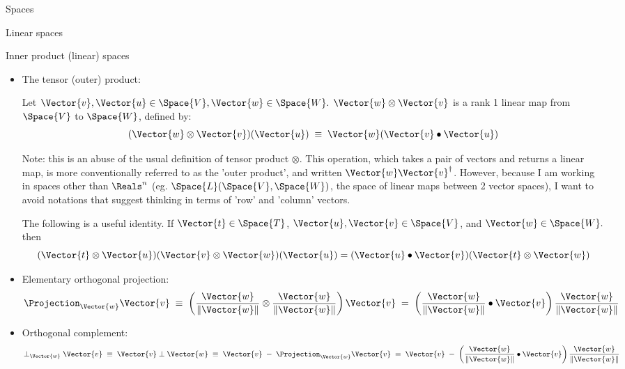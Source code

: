 \begin{plSection}{Spaces}
\begin{plSection}{Linear spaces}
\begin{plSection}{Inner product (linear) spaces}
\begin{itemize}
\item The tensor (outer) product:

Let $\Vector{v}, \Vector{u} \in \Space{V}, \Vector{w} \in \Space{W}.$
$\Vector{w} \otimes \Vector{v}$ is a rank 1 linear map
from $\Space{V}$ to $\Space{W}$, defined by:
\begin{equation}
(\Vector{w} \otimes \Vector{v})(\Vector{u}) \; \equiv \; \Vector{w} (\Vector{v} \bullet \Vector{u})
\end{equation}

Note: this is an abuse of the usual definition of tensor product $\otimes$.
This operation, which takes a pair of vectors and returns a linear map,
is more conventionally referred to as the 'outer product',
and written $\Vector{w} \Vector{v}^{\dagger}$.
However, because I am working in spaces other than $\Reals^n$
(eg. $\Space{L}(\Space{V},\Space{W})$, the space of linear maps
between 2 vector spaces),
I want to avoid notations that suggest thinking in terms
of 'row' and 'column' vectors.

The following is a useful identity.
If $\Vector{t} \in \Space{T}$, $\Vector{u}, \Vector{v} \in \Space{V}$, and $\Vector{w} \in \Space{W}.$
then
\begin{equation}
\label{eq:tensor-dot}
(\Vector{t} \otimes \Vector{u}) (\Vector{v} \otimes \Vector{w})(\Vector{u}) = (\Vector{u} \bullet \Vector{v}) (\Vector{t} \otimes \Vector{w})
\end{equation}

\item Elementary orthogonal projection:
\begin{equation}
\Projection_{\Vector{w}} \Vector{v}
\; \equiv \;
\left( \frac{ \Vector{w} }{ \| \Vector{w} \| } \otimes \frac{ \Vector{w} }{ \| \Vector{w} \| } \right) \Vector{v}
\; = \;
\left( \frac{\Vector{w} }{\|\Vector{w}\|} \bullet \Vector{v} \right) \frac{\Vector{w}}{\|\Vector{w}\|}
\end{equation}

\item Orthogonal complement:
\begin{equation}
\perp_{\Vector{w}} \Vector{v}
\; \equiv \;
\Vector{v} \perp \Vector{w}
\; \equiv \;
\Vector{v} \; - \; \Projection_{\Vector{w}} \Vector{v}
\; = \;
\Vector{v} \; - \; \left( \frac{\Vector{w}}{\|\Vector{w}\|} \bullet \Vector{v} \right) \frac{\Vector{w}}{\|\Vector{w}\|}
\end{equation}


\end{itemize}
\end{plSection}
\end{plSection}
\end{plSection}
